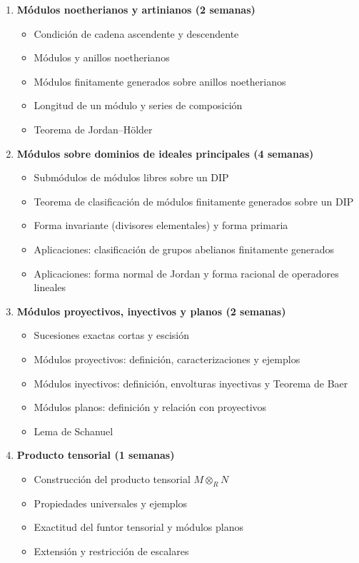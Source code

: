\begin{refsection}
\begin{enumerate}
    \item \textbf{Módulos noetherianos y artinianos (2 semanas)}
    \begin{itemize}
        \item Condición de cadena ascendente y descendente
        \item Módulos y anillos noetherianos
        \item Módulos finitamente generados sobre anillos noetherianos
        \item Longitud de un módulo y series de composición
        \item Teorema de Jordan--Hölder
    \end{itemize}

    \item \textbf{Módulos sobre dominios de ideales principales (4 semanas)}
    \begin{itemize}
        \item Submódulos de módulos libres sobre un DIP
        \item Teorema de clasificación de módulos finitamente generados sobre un DIP
        \item Forma invariante (divisores elementales) y forma primaria
        \item Aplicaciones: clasificación de grupos abelianos finitamente generados
        \item Aplicaciones: forma normal de Jordan y forma racional de operadores lineales
    \end{itemize}

    \item \textbf{Módulos proyectivos, inyectivos y planos (2 semanas)}
    \begin{itemize}
        \item Sucesiones exactas cortas y escisión
        \item Módulos proyectivos: definición, caracterizaciones y ejemplos
        \item Módulos inyectivos: definición, envolturas inyectivas y Teorema de Baer
        \item Módulos planos: definición y relación con proyectivos
        \item Lema de Schanuel
    \end{itemize}

    \item \textbf{Producto tensorial (1 semanas)}
    \begin{itemize}
        \item Construcción del producto tensorial $M \otimes_R N$
        \item Propiedades universales y ejemplos
        \item Exactitud del funtor tensorial y módulos planos
        \item Extensión y restricción de escalares
    \end{itemize}


\end{enumerate}
\end{refsection}
